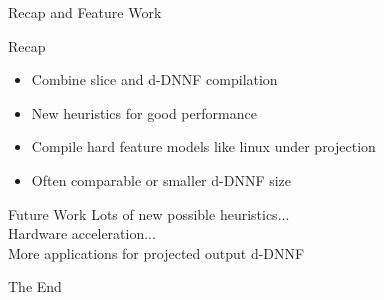\documentclass[
	aspectratio=169, %
	8pt, %
]{beamer}
\begin{document}
\begin{frame}{Recap and Feature Work}
    \begin{block}{Recap}
        \begin{itemize}
            \item Combine slice and d-DNNF compilation\pause
            \item New heuristics for good performance\pause
            \item Compile hard feature models like linux under projection \pause
            \item Often comparable or smaller d-DNNF size
        \end{itemize}
    \end{block}\pause
    \begin{block}{Future Work}
        Lots of new possible heuristics...\\ \pause
        Hardware acceleration...\\ \pause
        More applications for projected output d-DNNF 
    \end{block}

\end{frame}
\begin{frame}{The End}
\end{frame}
\end{document}
